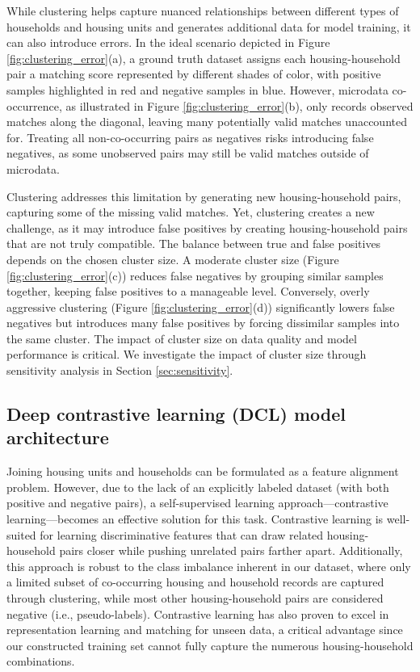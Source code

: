 \documentclass[]{nature_mod}
\begin{document}
While clustering helps capture nuanced relationships between different types of households and housing units and generates additional data for model training, it can also introduce errors. 
In the ideal scenario depicted in Figure \ref{fig:clustering_error}(a), a ground truth dataset assigns each housing-household pair a matching score represented by different shades of color, with positive samples highlighted in red and negative samples in blue. However, microdata co-occurrence, as illustrated in Figure \ref{fig:clustering_error}(b), only records observed matches along the diagonal, leaving many potentially valid matches unaccounted for. Treating all non-co-occurring pairs as negatives risks introducing false negatives, as some unobserved pairs may still be valid matches outside of microdata.

Clustering addresses this limitation by generating new housing-household pairs, capturing some of the missing valid matches. Yet, clustering creates a new challenge, as it may introduce false positives by creating housing-household pairs that are not truly compatible. The balance between true and false positives depends on the chosen cluster size. A moderate cluster size (Figure \ref{fig:clustering_error}(c)) reduces false negatives by grouping similar samples together, keeping false positives to a manageable level. Conversely, overly aggressive clustering (Figure \ref{fig:clustering_error}(d)) significantly lowers false negatives but introduces many false positives by forcing dissimilar samples into the same cluster. The impact of cluster size on data quality and model performance is critical. We investigate the impact of cluster size through sensitivity analysis in Section \ref{sec:sensitivity}.


\subsection{Deep contrastive learning (DCL) model architecture}\label{sec:model-architecture}

Joining housing units and households can be formulated as a feature alignment problem. However, due to the lack of an explicitly labeled dataset (with both positive and negative pairs), a self-supervised learning approach—contrastive learning—becomes an effective solution for this task. Contrastive learning is well-suited for learning discriminative features that can draw related housing-household pairs closer while pushing unrelated pairs farther apart. Additionally, this approach is robust to the class imbalance inherent in our dataset, where only a limited subset of co-occurring housing and household records are captured through clustering, while most other housing-household pairs are considered negative (i.e., pseudo-labels). Contrastive learning has also proven to excel in representation learning and matching for unseen data, a critical advantage since our constructed training set cannot fully capture the numerous housing-household combinations. 
\end{document}
